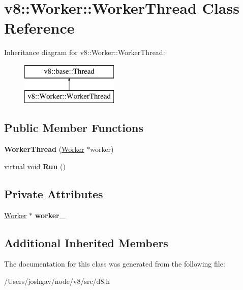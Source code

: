 \hypertarget{classv8_1_1_worker_1_1_worker_thread}{}\section{v8\+:\+:Worker\+:\+:Worker\+Thread Class Reference}
\label{classv8_1_1_worker_1_1_worker_thread}
Inheritance diagram for v8\+:\+:Worker\+:\+:Worker\+Thread\+:\begin{figure}[H]
\begin{center}
\leavevmode
\includegraphics[height=2.000000cm]{classv8_1_1_worker_1_1_worker_thread}
\end{center}
\end{figure}
\subsection*{Public Member Functions}
\begin{DoxyCompactItemize}
\item 
{\bfseries Worker\+Thread} (\hyperlink{classv8_1_1_worker}{Worker} $\ast$worker)\hypertarget{classv8_1_1_worker_1_1_worker_thread_ab33e3036cd0105a7c32094d3df84c819}{}\label{classv8_1_1_worker_1_1_worker_thread_ab33e3036cd0105a7c32094d3df84c819}

\item 
virtual void {\bfseries Run} ()\hypertarget{classv8_1_1_worker_1_1_worker_thread_a2d8d839a73ecb489afed06b4aebc2921}{}\label{classv8_1_1_worker_1_1_worker_thread_a2d8d839a73ecb489afed06b4aebc2921}

\end{DoxyCompactItemize}
\subsection*{Private Attributes}
\begin{DoxyCompactItemize}
\item 
\hyperlink{classv8_1_1_worker}{Worker} $\ast$ {\bfseries worker\+\_\+}\hypertarget{classv8_1_1_worker_1_1_worker_thread_a6f67770b46cc3ba67a6a07e4f3ac0a6c}{}\label{classv8_1_1_worker_1_1_worker_thread_a6f67770b46cc3ba67a6a07e4f3ac0a6c}

\end{DoxyCompactItemize}
\subsection*{Additional Inherited Members}


The documentation for this class was generated from the following file\+:\begin{DoxyCompactItemize}
\item 
/\+Users/joshgav/node/v8/src/d8.\+h\end{DoxyCompactItemize}

